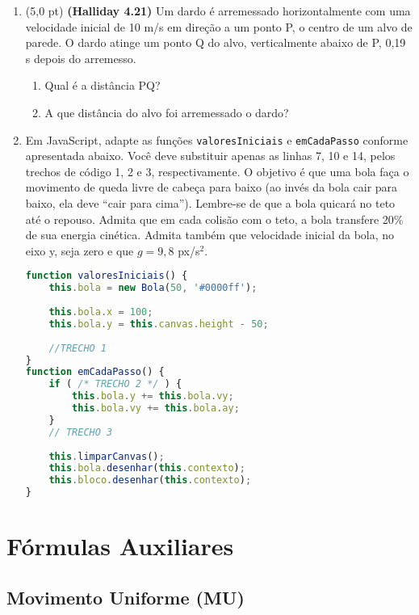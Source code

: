 \documentclass[12pt,a4paper,oneside]{article}
\begin{document}
\begin{enumerate}

	\item (5,0 pt) {\bf (Halliday 4.21)} Um dardo é arremessado horizontalmente com uma velocidade inicial de 10 m/s em direção a um ponto P, o centro de um alvo de parede. O dardo atinge um ponto Q do alvo, verticalmente abaixo de P, 0,19 s depois do arremesso. \label{q:dardo}
	\begin{enumerate}
		\item Qual é a distância PQ?
		\item A que distância do alvo foi arremessado o dardo?
	\end{enumerate}	
	
	\item Em JavaScript, adapte as funções {\tt valoresIniciais} e {\tt emCadaPasso} conforme apresentada abaixo. Você deve substituir apenas as linhas 7, 10 e 14, pelos trechos de código 1, 2 e 3, respectivamente. O objetivo é que uma bola faça o movimento de queda livre de cabeça para baixo (ao invés da bola cair para baixo, ela deve ``cair para cima''). Lembre-se de que a bola quicará no teto até o repouso. Admita que em cada colisão com o teto, a bola transfere 20\% de sua energia cinética. Admita também que velocidade inicial da bola, no eixo y, seja zero e que $g = 9,8$ px/s$^2$.
	
	\begin{lstlisting}[language=JavaScript]
function valoresIniciais() {
	this.bola = new Bola(50, '#0000ff');
	
	this.bola.x = 100;
	this.bola.y = this.canvas.height - 50;
	
	//TRECHO 1
}
function emCadaPasso() {    
	if ( /* TRECHO 2 */ ) {
		this.bola.y += this.bola.vy;
		this.bola.vy += this.bola.ay;
	} 
	// TRECHO 3
	
	this.limparCanvas();
	this.bola.desenhar(this.contexto);
	this.bloco.desenhar(this.contexto);
}\end{lstlisting}
	
\end{enumerate}

\newpage

\section{Fórmulas Auxiliares}

\subsection{Movimento Uniforme (MU)}
\end{document}

